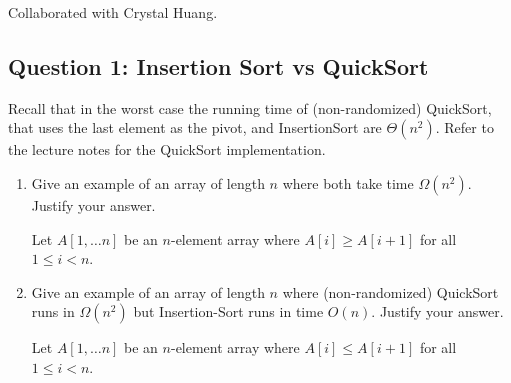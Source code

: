 \def\lc{\left\lceil}   
\def\rc{\right\rceil}
\runningheadrule
\firstpageheadrule
\cfoot{}
Collaborated with Crystal Huang.
\subsection*{Question 1: Insertion Sort vs QuickSort}

Recall that in the worst case the running time of (non-randomized) {\sc QuickSort}, that uses the last element as the pivot, and {\sc InsertionSort} are $\Theta(n^2)$. Refer to the lecture notes for the {\sc QuickSort} implementation.

\begin{enumerate}
    \item Give an example of an array of length $n$ where both take time $\Omega(n^2)$. Justify your answer.  
\begin{solution}
Let $A[1,\dots n]$ be an $n$-element array where $A[i]\geq A[i+1]$ for all $1\leq i<n$.\\
\end{solution}
    \item Give an example of an array of length $n$ where (non-randomized) {\sc QuickSort} runs in $\Omega(n^2)$ but {\sc Insertion-Sort} runs in time $O(n)$. Justify your answer. 
\begin{solution}
Let $A[1,\dots n]$ be an $n$-element array where $A[i]\leq A[i+1]$ for all $1\leq i<n$.
\end{solution}
\end{enumerate}
